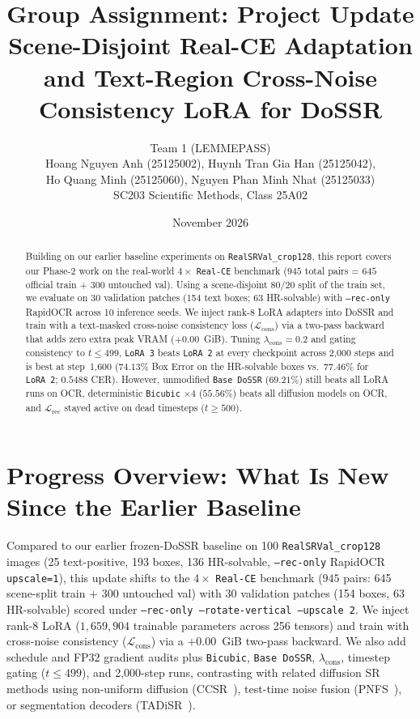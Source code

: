 \documentclass[11pt]{article}
\title{Group Assignment: Project Update\\
\large Scene-Disjoint Real-CE Adaptation and Text-Region Cross-Noise Consistency LoRA for DoSSR}
\author{Team 1 (LEMMEPASS)\\
Hoang Nguyen Anh (25125002), Huynh Tran Gia Han (25125042),\\
Ho Quang Minh (25125060), Nguyen Phan Minh Nhat (25125033)\\
SC203 Scientific Methods, Class 25A02}
\date{November 2026}
\begin{document}
\maketitle

\begin{abstract}
Building on our earlier baseline experiments on \texttt{RealSRVal\_crop128}, this report covers our Phase-2 work on the real-world $4\times$ \texttt{Real-CE} benchmark ($945$ total pairs = $645$ official train + $300$ untouched val). Using a scene-disjoint $80/20$ split of the train set, we evaluate on 30 validation patches (154 text boxes; 63 HR-solvable) with \texttt{--rec-only} RapidOCR across 10 inference seeds. We inject rank-8 LoRA adapters into DoSSR and train with a text-masked cross-noise consistency loss ($\mathcal{L}_{\text{cons}}$) via a two-pass backward that adds zero extra peak VRAM ($+0.00$~GiB). Tuning $\lambda_{\text{cons}} = 0.2$ and gating consistency to $t \le 499$, \texttt{LoRA~3} beats \texttt{LoRA~2} at every checkpoint across 2,000 steps and is best at step~1,600 ($74.13\%$ Box Error on the HR-solvable boxes vs.\ $77.46\%$ for \texttt{LoRA~2}; $0.5488$ CER). However, unmodified \texttt{Base DoSSR} ($69.21\%$) still beats all LoRA runs on OCR, deterministic \texttt{Bicubic} $\times 4$ ($55.56\%$) beats all diffusion models on OCR, and $\mathcal{L}_{\text{rec}}$ stayed active on dead timesteps ($t \ge 500$).
\end{abstract}

\section{Progress Overview: What Is New Since the Earlier Baseline}
Compared to our earlier frozen-DoSSR baseline on 100 \texttt{RealSRVal\_crop128} images (25 text-positive, 193 boxes, 136 HR-solvable, \texttt{--rec-only} RapidOCR \texttt{upscale=1}), this update shifts to the $4\times$ \texttt{Real-CE} benchmark ($945$ pairs: 645 scene-split train + 300 untouched val) with 30 validation patches (154 boxes, 63 HR-solvable) scored under \texttt{--rec-only --rotate-vertical --upscale 2}. We inject rank-8 LoRA ($1{,}659{,}904$ trainable parameters across 256 tensors) and train with cross-noise consistency ($\mathcal{L}_{\text{cons}}$) via a $+0.00$~GiB two-pass backward. We also add schedule and FP32 gradient audits plus \texttt{Bicubic}, \texttt{Base DoSSR}, $\lambda_{\text{cons}}$, timestep gating ($t \le 499$), and 2,000-step runs, contrasting with related diffusion SR methods using non-uniform diffusion (CCSR~\cite{sun2024ccsr}), test-time noise fusion (PNFS~\cite{jiang2025pnfs}), or segmentation decoders (TADiSR~\cite{hu2025tadIsr}).
\end{document}
